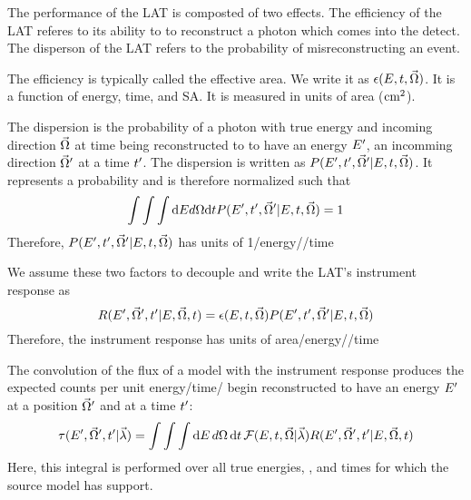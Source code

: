 

The performance of the LAT is composted of two effects.
The efficiency of the LAT referes to its ability to to
reconstruct a photon which comes into the detect.
The disperson of the LAT refers to the probability of
misreconstructing an event. 


The efficiency is typically called the effective area.
We write it as $\epsilon(E,t,\vec\Omega)$.
It is a function of energy, time, and \gls{SA}.
It is measured in units of area ($\text{cm}^2$).



The dispersion is the probability of a photon with true energy \energy
and incoming direction $\vec\Omega$ at time \time being reconstructed to 
to have an energy $E'$, an incomming direction $\vec\Omega'$ at a time $t'$.
The dispersion is written as $P(E',t',\vec\Omega'|E,t,\vec\Omega)$.
It represents a probability and is therefore normalized such that
\begin{equation}
  \int \int \int \text{d}E d\Omega \text{d}t P(E',t',\vec\Omega'|E,t,\vec\Omega) = 1
\end{equation}
Therefore, $P(E',t',\vec\Omega'|E,t,\vec\Omega)$ 
has units of 1/energy//time



We assume these two factors to decouple and write the LAT's instrument response as
\begin{equation}
  R(E',\vec\Omega',t'|E,\vec\Omega,t) = 
\epsilon(E,t,\vec\Omega) P(E',t',\vec\Omega'|E,t,\vec\Omega)
\end{equation}
Therefore, the instrument response has units of area/energy//time

The convolution of the flux of a model with the instrument response 
produces the expected counts per unit energy/time/
begin reconstructed to have 
an energy $E'$ 
at a position $\vec\Omega'$ and at a time $t'$:
\begin{equation}
  \eqnlabel{eventrate}
  \eventrate(\energy',\solidangle',\time'|\modelparams)
  = \int \int \int \denergy \, \dsolidangle \, \dtime \,
  \fluxdensity(\energy,\time,\vec\Omega|\modelparams) \response(\energy',\solidangle',\time'|\energy,\solidangle,\time)
\end{equation}
Here, this integral is performed over all true energies, , and times
for which the source model has support.

